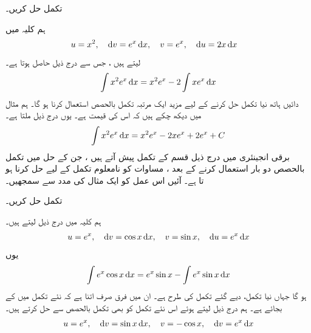 تکمل  حل کریں۔ 

ہم کلیہ  میں
\begin{align*}
u&=x^2,\quad \dif v=e^x\dif x,\quad v=e^x,\quad \dif u=2x\dif x
\end{align*}
لیتے ہیں ، جس سے درج ذیل حاصل ہوتا ہے۔
\begin{align*}
\int x^2e^x\dif x=x^2e^x-2\int xe^x\dif x
\end{align*} 
 دائیں ہاتھ نیا تکمل حل کرنے کے لیے مزید ایک  مرتبہ تکمل بالحصص استعمال کرنا ہو گا۔ ہم مثال  میں دیکھ چکے ہیں کہ اس کی قیمت  ہے۔ یوں درج ذیل ملتا ہے۔
\begin{align*}
\int x^2e^x\dif x=x^2e^x-2xe^x+2e^x+C
\end{align*}
برقی انجینئری میں درج ذیل قسم کے تکمل پیش آتے  ہیں ، جن کے حل میں تکمل بالحصص دو بار استعمال کرنے کے بعد ، مساوات کو  نامعلوم تکمل کے لیے حل کرنا  ہو تا ہے۔ آئیں اس عمل کو ایک مثال کی مدد سے سمجھیں۔

تکمل  حل کریں۔

ہم کلیہ  میں درج ذیل لیتے ہیں۔
\begin{align*}
u=e^x,\quad \dif v=\cos x\dif x,\quad v=\sin x,\quad \dif u=e^x\dif x
\end{align*}
یوں
\begin{align*}
\int e^x\cos x\dif x=e^x\sin x-\int e^x\sin x\dif x
\end{align*}
ہو گا  جہاں نیا تکمل، دیے گئے تکمل کی طرح ہے۔ ان میں فرق صرف اتنا ہے کہ نئے تکمل میں  کے بجائے  ہے۔ ہم درج ذیل لیتے ہوئے اس نئے تکمل کو بھی تکمل بالحصص سے  حل کرتے ہیں۔
\begin{align*}
u=e^x,\quad \dif v=\sin x\dif x,\quad v=-\cos x,\quad \dif v=e^x\dif x
\end{align*}

